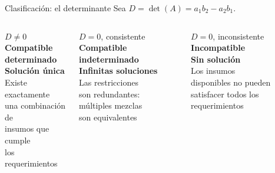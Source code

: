 \documentclass[11pt, aspectratio=169]{beamer}
\begin{document}
	\begin{frame}{Clasificación: el determinante}
		Sea $D = \det(A) = a_1 b_2 - a_2 b_1$.
		
		\vspace{0.5em}
		\begin{columns}[T]
			\begin{exampleblock}{$D \neq 0$}
				\centering\textbf{Compatible\\determinado}\\[4pt]
				\textbf{Solución única}\\[4pt]
				Existe exactamente\\una combinación de\\insumos que cumple\\los requerimientos
			\end{exampleblock}
			
			\begin{block}{$D = 0$, consistente}
				\centering\textbf{Compatible\\indeterminado}\\[4pt]
				\textbf{Infinitas soluciones}\\[4pt]
				Las restricciones\\son redundantes:\\múltiples mezclas\\son equivalentes
			\end{block}
			
			\begin{alertblock}{$D = 0$, inconsistente}
				\centering\textbf{Incompatible}\\[4pt]
				\textbf{Sin solución}\\[4pt]
				Los insumos\\disponibles no pueden\\satisfacer todos los\\requerimientos
			\end{alertblock}
		\end{columns}
	\end{frame}
	
\end{document}
